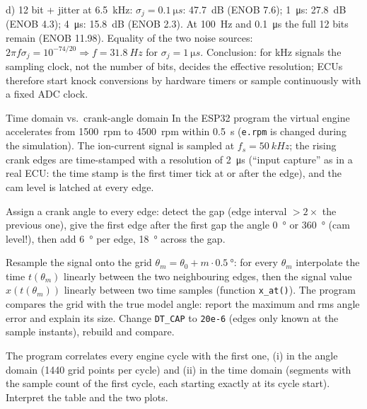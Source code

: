 \begin{solution}
d) 12 bit + jitter at \SI{6.5}{kHz}: $\sigma_j=\SI{0.1}{\micro s}$:
\SI{47.7}{dB} (ENOB 7.6); \SI{1}{\micro s}: \SI{27.8}{dB} (ENOB 4.3);
\SI{4}{\micro s}: \SI{15.8}{dB} (ENOB 2.3). At \SI{100}{Hz} and
\SI{0.1}{\micro s} the full 12 bits remain (ENOB 11.98). Equality of the two
noise sources: $2\pi f\sigma_j=10^{-74/20}\Rightarrow f=\SI{31.8}{Hz}$ for
$\sigma_j=\SI{1}{\micro s}$. Conclusion: for kHz signals the sampling clock,
not the number of bits, decides the effective resolution; ECUs therefore
start knock conversions by hardware timers or sample continuously with a
fixed ADC clock.
\end{solution}

\begin{exercise}{Time domain vs.\ crank-angle domain}{\Wokwi}
In the ESP32 program  the virtual
engine accelerates from \SI{1500}{rpm} to \SI{4500}{rpm} within \SI{0.5}{s}
(\texttt{e.rpm} is changed during the simulation). The ion-current signal is
sampled at $f_s=\SI{50}{kHz}$; the rising crank edges are time-stamped with a
resolution of \SI{2}{\micro s} (``input capture'' as in a real ECU: the time
stamp is the first timer tick at or after the edge), and the cam level is
latched at every edge.
\begin{tasks}
  \item Assign a crank angle to every edge: detect the gap (edge interval
    $>2\times$ the previous one), give the first edge after the first gap the
    angle \SI{0}{\degree} or \SI{360}{\degree} (cam level!), then add
    \SI{6}{\degree} per edge, \SI{18}{\degree} across the gap.
  \item Resample the signal onto the grid $\theta_m=\theta_0+m\cdot\SI{0.5}{\degree}$:
    for every $\theta_m$ interpolate the time $t(\theta_m)$ linearly between
    the two neighbouring edges, then the signal value $x(t(\theta_m))$
    linearly between two time samples (function \texttt{x\_at()}). The
    program compares the grid with the true model angle: report the maximum
    and rms angle error and explain its size. Change \texttt{DT\_CAP} to
    \texttt{20e-6} (edges only known at the sample instants), rebuild and
    compare.
  \item The program correlates every engine cycle with the first one,
    (i) in the angle domain (1440 grid points per cycle) and (ii) in the time
    domain (segments with the sample count of the first cycle, each starting
    exactly at its cycle start). Interpret the table and the two plots.

\end{tasks}
\end{exercise}
